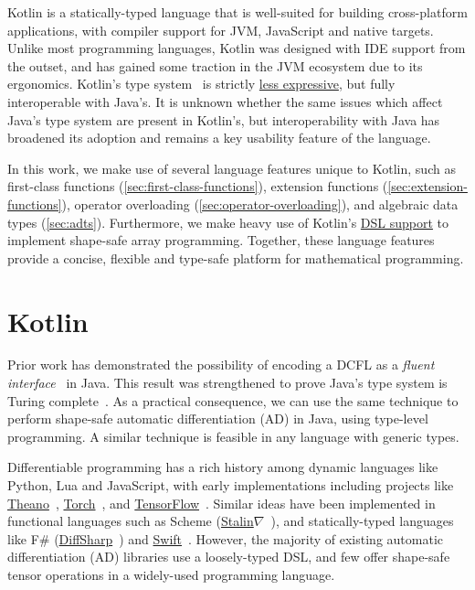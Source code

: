 \documentclass[12pt,initial,twoside,maitrise]{dms}
\numberwithin{equation}{section}
\numberwithin{table}{chapter}
\numberwithin{figure}{chapter}
\begin{document}
Kotlin is a statically-typed language that is well-suited for building cross-platform applications, with compiler support for JVM, JavaScript and native targets. Unlike most programming languages, Kotlin was designed with IDE support from the outset, and has gained some traction in the JVM ecosystem due to its ergonomics. Kotlin's type system~\citep{tate2013mixed} is strictly \href{https://kotlinlang.org/docs/reference/generics.html#variance}{less expressive}, but fully interoperable with Java's. It is unknown whether the same issues which affect Java's type system are present in Kotlin's, but interoperability with Java has broadened its adoption and remains a key usability feature of the language.

In this work, we make use of several language features unique to Kotlin, such as first-class functions (\autoref{sec:first-class-functions}), extension functions (\autoref{sec:extension-functions}), operator overloading (\autoref{sec:operator-overloading}), and algebraic data types (\autoref{sec:adts}). Furthermore, we make heavy use of Kotlin's \href{https://kotlinlang.org/docs/reference/type-safe-builders.html}{DSL support} to implement shape-safe array programming. Together, these language features provide a concise, flexible and type-safe platform for mathematical programming.

\section{Kotlin\textorpdfstring{$\nabla$}}\label{sec:kotlingrad}

Prior work has demonstrated the possibility of encoding a DCFL as a \textit{fluent interface}~\citep{gil2016formal, nakamaru2017silverchain} in Java. This result was strengthened to prove Java's type system is Turing complete~\citep{grigore2017java}. As a practical consequence, we can use the same technique to perform shape-safe automatic differentiation (AD) in Java, using type-level programming. A similar technique is feasible in any language with generic types.

Differentiable programming has a rich history among dynamic languages like Python, Lua and JavaScript, with early implementations including projects like \href{http://deeplearning.net/software/theano/}{Theano}~\citep{bergstra2010theano}, \href{http://torch.ch/}{Torch}~\citep{collobert2002torch}, and \href{https://tensorflow.org/}{TensorFlow}~\citep{abadi2016tensorflow}. Similar ideas have been implemented in functional languages such as Scheme (\href{https://github.com/Functional-AutoDiff/STALINGRAD}{Stalin$\nabla$}~\citep{pearlmutter2008using}), and statically-typed languages like F\# (\href{https://diffsharp.github.io/DiffSharp/}{DiffSharp}~\citep{baydin2015diffsharp}) and \href{https://www.tensorflow.org/swift}{Swift}~\citep{lattner2018tensorflow}. However, the majority of existing automatic differentiation (AD) libraries use a loosely-typed DSL, and few offer shape-safe tensor operations in a widely-used programming language.
\end{document}
